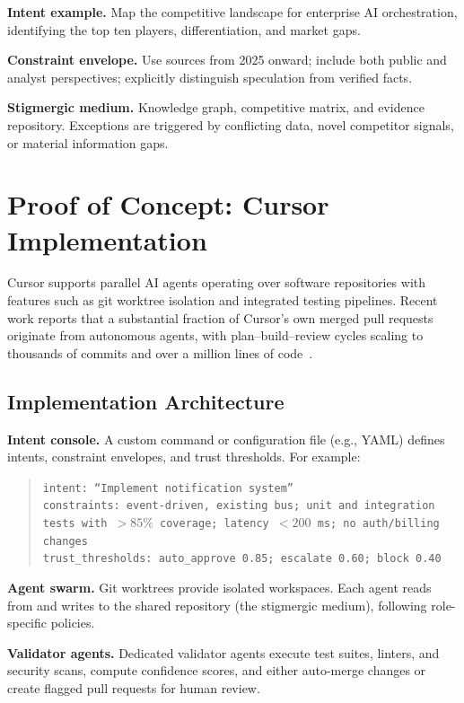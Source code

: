 \documentclass[11pt]{article}
\begin{document}
\textbf{Intent example.} Map the competitive landscape for enterprise AI orchestration, identifying the top ten players, differentiation, and market gaps.

\textbf{Constraint envelope.} Use sources from 2025 onward; include both public and analyst perspectives; explicitly distinguish speculation from verified facts.

\textbf{Stigmergic medium.} Knowledge graph, competitive matrix, and evidence repository. Exceptions are triggered by conflicting data, novel competitor signals, or material information gaps.

\section{Proof of Concept: Cursor Implementation}

Cursor supports parallel AI agents operating over software repositories with features such as git worktree isolation and integrated testing pipelines. Recent work reports that a substantial fraction of Cursor's own merged pull requests originate from autonomous agents, with plan--build--review cycles scaling to thousands of commits and over a million lines of code~\cite{cursor2026scaling}.

\subsection{Implementation Architecture}

\textbf{Intent console.} A custom command or configuration file (e.g., YAML) defines intents, constraint envelopes, and trust thresholds. For example:
\begin{quote}
\texttt{intent: ``Implement notification system''}\\
\texttt{constraints: event-driven, existing bus; unit and integration tests with $>85\%$ coverage; latency $<200$ ms; no auth/billing changes}\\
\texttt{trust\_thresholds: auto\_approve 0.85; escalate 0.60; block 0.40}
\end{quote}

\textbf{Agent swarm.} Git worktrees provide isolated workspaces. Each agent reads from and writes to the shared repository (the stigmergic medium), following role-specific policies.

\textbf{Validator agents.} Dedicated validator agents execute test suites, linters, and security scans, compute confidence scores, and either auto-merge changes or create flagged pull requests for human review.
\end{document}
